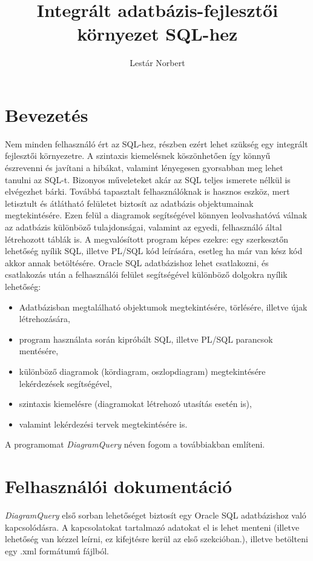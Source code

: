 \documentclass{elteikthesis}
\title{\textbf{Integrált adatbázis-fejlesztői környezet SQL-hez}}
\author{Lestár Norbert}
\begin{document}
\frontmatter

	\maketitle
	\tableofcontents
	
\mainmatter

\chapter{Bevezetés} 
Nem minden felhasználó ért az SQL-hez, részben ezért lehet szükség egy integrált fejlesztői
környezetre. A szintaxis kiemelésnek köszönhetően így könnyű észrevenni és javítani a hibákat,
valamint lényegesen gyorsabban meg lehet tanulni az SQL-t. Bizonyos műveleteket akár az SQL teljes
ismerete nélkül is elvégezhet bárki. Továbbá tapasztalt felhasználóknak is hasznos eszköz, mert
letisztult és átlátható felületet biztosít az adatbázis objektumainak megtekintésére. Ezen felül a
diagramok segítségével könnyen leolvashatóvá válnak az adatbázis különböző tulajdonságai, valamint
az egyedi, felhasználó által létrehozott táblák is.
A megvalósított program képes ezekre:
egy szerkesztőn lehetőség nyílik SQL, illetve PL/SQL kód leírására,
esetleg ha már van kész kód akkor annak betöltésére.
Oracle SQL adatbázishoz lehet csatlakozni, és
csatlakozás után a felhasználói felület segítségével különböző dolgokra nyílik lehetőség:
\begin{itemize}
  \item Adatbázisban megtalálható objektumok megtekintésére, törlésére, illetve újak létrehozására,
  \item program használata során kipróbált SQL, illetve PL/SQL parancsok mentésére,
  \item különböző diagramok (kördiagram, oszlopdiagram) megtekintésére lekérdezések segítségével,
  \item szintaxis kiemelésre (diagramokat létrehozó utasítás esetén is),
  \item valamint lekérdezési tervek megtekintésére is.
\end{itemize}
A programomat \textit{DiagramQuery} néven fogom a továbbiakban említeni.

\chapter{Felhasználói dokumentáció}
\textit{DiagramQuery} első sorban lehetőséget biztosít egy Oracle SQL adatbázishoz való kapcsolódásra.
A kapcsolatokat tartalmazó adatokat el is lehet menteni (illetve lehetőség van kézzel leírni,
ez kifejtésre kerül az első szekcióban.), illetve betölteni egy .xml formátumú fájlból.
\end{document}
